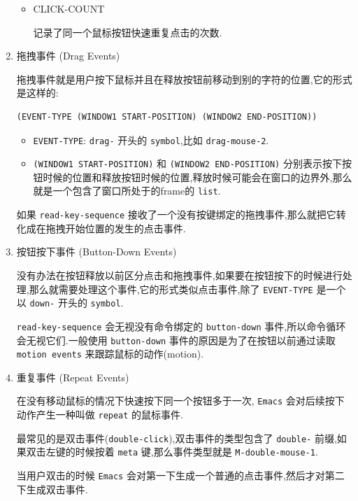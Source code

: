 \documentclass[11pt]{article}
\begin{document}
\begin{enumerate}
\begin{itemize}
\item CLICK-COUNT

记录了同一个鼠标按钮快速重复点击的次数.
\end{itemize}


\item 拖拽事件 (Drag Events)
\label{sec:org10e7098}

拖拽事件就是用户按下鼠标并且在释放按钮前移动到别的字符的位置,它的形式是这样的:

\begin{verbatim}
(EVENT-TYPE (WINDOW1 START-POSITION) (WINDOW2 END-POSITION))
\end{verbatim}

\begin{itemize}
\item \texttt{EVENT-TYPE}: \texttt{drag-} 开头的 \texttt{symbol},比如 \texttt{drag-mouse-2}.
\item \texttt{(WINDOW1 START-POSITION)} 和 \texttt{(WINDOW2 END-POSITION)} 分别表示按下按钮时候的位置和释放按钮时候的位置,释放时候可能会在窗口的边界外,那么就是一个包含了窗口所处于的frame的 \texttt{list}.
\end{itemize}

如果 \texttt{read-key-sequence} 接收了一个没有按键绑定的拖拽事件,那么就把它转化成在拖拽开始位置的发生的点击事件.


\item 按钮按下事件 (Button-Down Events)
\label{sec:org9dec4e7}

没有办法在按钮释放以前区分点击和拖拽事件,如果要在按钮按下的时候进行处理,那么就需要处理这个事件,它的形式类似点击事件,除了 \texttt{EVENT-TYPE} 是一个以 \texttt{down-} 开头的 \texttt{symbol}.

\texttt{read-key-sequence} 会无视没有命令绑定的 \texttt{button-down} 事件,所以命令循环会无视它们.一般使用 \texttt{button-down} 事件的原因是为了在按钮以前通过读取 \texttt{motion events} 来跟踪鼠标的动作(motion).


\item 重复事件 (Repeat Events)
\label{sec:org6a24709}

在没有移动鼠标的情况下快速按下同一个按钮多于一次, \texttt{Emacs} 会对后续按下动作产生一种叫做 \texttt{repeat} 的鼠标事件.

最常见的是双击事件(\texttt{double-click}),双击事件的类型包含了 \texttt{double-} 前缀,如果双击左键的时候按着 \texttt{meta} 键,那么事件类型就是 \texttt{M-double-mouse-1}.

当用户双击的时候 \texttt{Emacs} 会对第一下生成一个普通的点击事件,然后才对第二下生成双击事件.


\end{enumerate}
\end{document}
